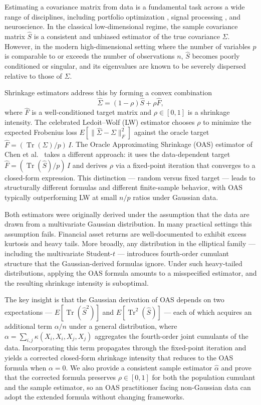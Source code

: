 \documentclass[10pt,twoside,titlepage]{article}
\begin{document}
Estimating a covariance matrix from data is a fundamental task across a wide range of
disciplines, including portfolio optimization \cite{LW2004}, signal processing \cite{OAS},
and neuroscience.
In the classical low-dimensional regime, the sample covariance matrix $\hat{S}$ is a
consistent and unbiased estimator of the true covariance $\Sigma$.
However, in the modern high-dimensional setting where the number of variables $p$ is
comparable to or exceeds the number of observations $n$, $\hat{S}$ becomes poorly
conditioned or singular, and its eigenvalues are known to be severely dispersed relative
to those of $\Sigma$.

Shrinkage estimators address this by forming a convex combination
\begin{equation*}
\hat{\Sigma} = (1 - \rho)\hat{S} + \rho \hat{F},
\end{equation*}
where $\hat{F}$ is a well-conditioned target matrix and $\rho \in [0,1]$ is a shrinkage
intensity.
The celebrated Ledoit--Wolf (LW) estimator \cite{LW2004} chooses $\rho$ to minimize the
expected Frobenius loss $E[\lVert \hat{\Sigma} - \Sigma \rVert_F^2]$ against the oracle
target $\hat{F} = (\operatorname{Tr}(\Sigma)/p)\,I$.
The Oracle Approximating Shrinkage (OAS) estimator of Chen et al.\ \cite{OAS} takes a
different approach: it uses the data-dependent target
$\hat{F} = (\operatorname{Tr}(\hat{S})/p)\,I$ and derives $\rho$ via a fixed-point
iteration that converges to a closed-form expression.
This distinction --- random versus fixed target --- leads to structurally different
formulas and different finite-sample behavior, with OAS typically outperforming LW
at small $n/p$ ratios under Gaussian data.

Both estimators were originally derived under the assumption that the data are drawn from
a multivariate Gaussian distribution.
In many practical settings this assumption fails.
Financial asset returns are well-documented to exhibit excess kurtosis and heavy tails.
More broadly, any distribution in the elliptical family --- including the multivariate
Student-$t$ --- introduces fourth-order cumulant structure that the Gaussian-derived
formulas ignore.
Under such heavy-tailed distributions, applying the OAS formula amounts to a misspecified
estimator, and the resulting shrinkage intensity is suboptimal.

The key insight is that the Gaussian derivation of OAS depends on two expectations ---
$E[\operatorname{Tr}(\hat{S}^2)]$ and $E[\operatorname{Tr}^2(\hat{S})]$ --- each of which
acquires an additional term $\alpha/n$ under a general distribution, where
$\alpha = \sum_{i,j} \kappa(X_i, X_i, X_j, X_j)$ aggregates the fourth-order joint
cumulants of the data.
Incorporating this term propagates through the fixed-point iteration and yields a
corrected closed-form shrinkage intensity that reduces to the OAS formula when
$\alpha = 0$.
We also provide a consistent sample estimator $\hat{\alpha}$ and prove that the corrected
formula preserves $\rho \in [0,1]$ for both the population cumulant and the sample
estimator, so an OAS practitioner facing non-Gaussian data can adopt the extended
formula without changing frameworks.
\end{document}
